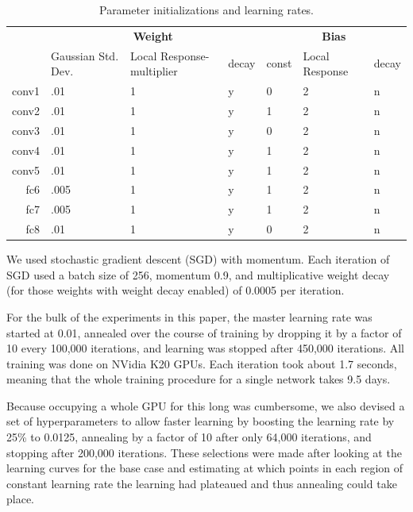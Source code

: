 \begin{table}[t]
\caption{Parameter initializations and learning rates. }
\label{tab:learning_hyperparams}
\begin{center}
\begin{tabular}{|r|l|l|l|l|l|l|}
\hline
       & \multicolumn{3}{c|}{\bf Weight}     &  \multicolumn{3}{c|}{\bf Bias}       \\
\cline{2-7}
       & Gaussian Std. Dev.   & Local Response-multiplier & decay &  const  & Local Response  & decay \\
\hline
conv1  & .01    & 1       & y     &  0      & 2   & n     \\
conv2  & .01    & 1       & y     &  1      & 2   & n     \\
conv3  & .01    & 1       & y     &  0      & 2   & n     \\
conv4  & .01    & 1       & y     &  1      & 2   & n     \\
conv5  & .01    & 1       & y     &  1      & 2   & n     \\
fc6    & .005   & 1       & y     &  1      & 2   & n     \\
fc7    & .005   & 1       & y     &  1      & 2   & n     \\
fc8    & .01    & 1       & y     &  0      & 2   & n     \\ 
\hline
\end{tabular}
\end{center}
\end{table}

We used stochastic gradient descent (SGD) with momentum. Each iteration of SGD used a batch size of 256, momentum 0.9, and multiplicative weight decay (for those weights with weight decay enabled) of 0.0005 per iteration.

For the bulk of the experiments in this paper, the master learning rate was started at 0.01, annealed over the course of training by dropping it by a factor of 10 every 100,000 iterations, and learning was stopped after 450,000 iterations. All training was done on NVidia K20 GPUs. Each iteration took about 1.7 seconds, meaning that the whole training procedure for a single network takes 9.5 days.

Because occupying a whole GPU for this long was cumbersome, we also devised a set of hyperparameters to allow faster learning by boosting the learning rate by 25\% to 0.0125, annealing by a factor of 10 after only 64,000 iterations, and stopping after 200,000 iterations. These selections were made after looking at the learning curves for the base case and estimating at which points in each region of constant learning rate the learning had plateaued and thus annealing could take place.


